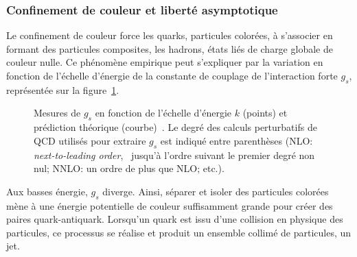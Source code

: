 \subsubsection{Confinement de couleur et liberté asymptotique}\label{chapter-MS-MSSM-section-formalisme-subsec-QCD-subsubsec-confinement}
Le confinement de couleur force les quarks, particules colorées, à s'associer en formant des particules composites, les hadrons, états liés de charge globale de couleur nulle. Ce phénomène empirique peut s'expliquer par la variation en fonction de l'échelle d'énergie de la constante de couplage de l'interaction forte $g_s$, représentée sur la figure~\ref{fig-g_s_fct_energy}.
\begin{figure}[h]
\centering
{}
\caption[Mesure de $g_s$ en fonction de l'échelle d'énergie.]{Mesures de $g_s$ en fonction de l'échelle d'énergie $k$ (points) et prédiction théorique (courbe)~\cite{PDG_booklet_2018}. Le degré des calculs perturbatifs de QCD utilisés pour extraire $g_s$ est indiqué entre parenthèses (NLO: \emph{next-to-leading order}, \ie\ jusqu'à l'ordre suivant le premier degré non nul; NNLO: un ordre de plus que NLO; etc.).}
\label{fig-g_s_fct_energy}
\end{figure}
\par Aux basses énergie, $g_s$ diverge.
Ainsi, séparer et isoler des particules colorées mène à une énergie potentielle de couleur suffisamment grande pour créer des paires quark-antiquark. Lorsqu'un quark est issu d'une collision en physique des particules, ce processus se réalise et produit un ensemble collimé de particules, un jet.

